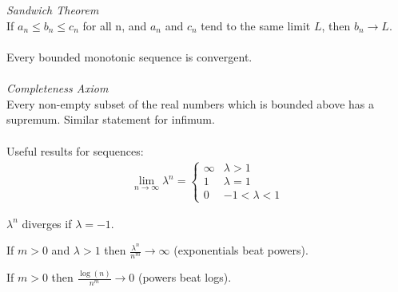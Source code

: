 \documentclass{article}
\begin{document}
\\\\
\textit{Sandwich Theorem}
\\
If $ a_{n} \leq b_{n} \leq c_{n} $ for all n, and $ a_{n} $ and $ c_{n} $ tend to the same limit $ L $, then $ b_{n} \to L $.
\\\\
Every bounded monotonic sequence is convergent.
\\\\
\textit{Completeness Axiom}
\\
Every non-empty subset of the real numbers which is bounded above has a supremum. Similar statement for infimum.
\\\\
Useful results for sequences:
\begin{align}
\lim_{n \to \infty} \lambda^{n} = 
\begin{cases}
\infty & \lambda > 1 \\
1 & \lambda = 1 \\
0 & -1 < \lambda < 1
\end{cases}
\end{align}
\begin{center}
$ \lambda^{n} $ diverges if $ \lambda = -1 $.
\end{center}
\begin{center}
If $ m > 0 $ and $ \lambda > 1 $ then $ \frac{\lambda^{n}}{n^{m}} \to \infty $ (exponentials beat powers).
\end{center}
\begin{center}
If $ m > 0 $ then $ \frac{\log(n)}{n^{m}} \to 0 $ (powers beat logs).
\end{center}
\end{document}
